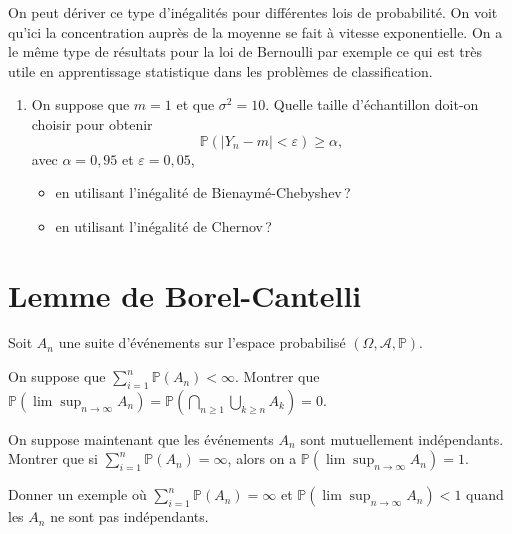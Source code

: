 On peut dériver ce type d'inégalités pour différentes lois de
probabilité. On voit qu'ici la concentration auprès de la moyenne se
fait à vitesse exponentielle. On a le même type de résultats pour la loi
de Bernoulli par exemple ce qui est très utile en apprentissage
statistique dans les problèmes de classification.

\label{IV-idc3}

\begin{enumerate}
\def\labelenumi{\roman{enumi})}
\setcounter{enumi}{3}
\item
  On suppose que \(m = 1\) et que \(\sigma^2 = 10\). Quelle taille
  d'échantillon doit-on choisir pour obtenir
  \[\mathbb{P}(|Y_n - m| < \varepsilon) \geq \alpha,\] avec
  \(\alpha = 0,95\) et \(\varepsilon = 0,05\),

  \begin{itemize}
  \tightlist
  \item
    en utilisant l'inégalité de Bienaymé-Chebyshev\,?
  \item
    en utilisant l'inégalité de Chernov\,?
  \end{itemize}
\end{enumerate}


\section{Lemme de Borel-Cantelli}\label{IV-lemme-de-borel-cantelli}

Soit \(A_n\) une suite d'événements sur l'espace probabilisé
\((\Omega,\mathcal{A}, \mathbb{P})\).

\label{IV-bc1}
On suppose que \(\sum_{i=1}^n \mathbb{P}(A_n) < \infty\). Montrer que
\(\mathbb{P}(\lim \sup_{n \to \infty} A_n) = \mathbb{P}\left(\bigcap_{n\geq 1} \bigcup_{k \geq n} A_k \right) =0\).

\label{IV-bc2}
On suppose maintenant que les événements \(A_n\) sont mutuellement
indépendants. Montrer que si \(\sum_{i=1}^n \mathbb{P}(A_n) = \infty\),
alors on a
\(\mathbb{P}(\lim \sup_{n \to \infty} A_n) = 1\).

\label{IV-bc3}
Donner un exemple où \(\sum_{i=1}^n \mathbb{P}(A_n) = \infty\) et
\(\mathbb{P}(\lim \sup_{n \to \infty} A_n) < 1\) quand les \(A_n\) ne
sont pas indépendants.

